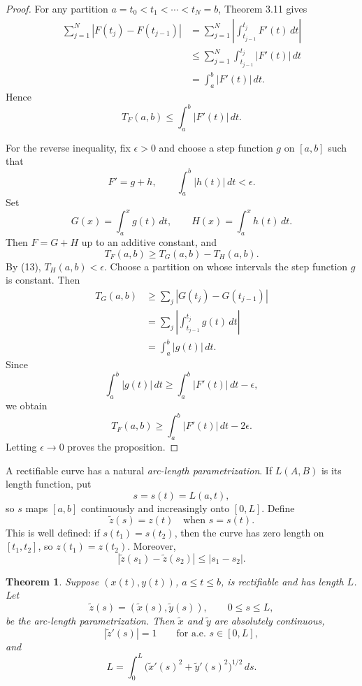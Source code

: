 \documentclass[11pt,openany]{book}
\newtheorem{theorem}{Theorem}[section]
\begin{document}
\begin{proof}
For any partition $a=t_0<t_1<\cdots<t_N=b$, Theorem 3.11 gives
\begin{align*}
\sum_{j=1}^N|F(t_j)-F(t_{j-1})|
&=\sum_{j=1}^N\left|\int_{t_{j-1}}^{t_j}F'(t)\,dt\right|\\
&\le\sum_{j=1}^N\int_{t_{j-1}}^{t_j}|F'(t)|\,dt\\
&=\int_a^b|F'(t)|\,dt.
\end{align*}
Hence
\begin{equation}
T_F(a,b)\le\int_a^b|F'(t)|\,dt.
\tag{13}
\end{equation}

For the reverse inequality, fix $\epsilon>0$ and choose a step function $g$ on $[a,b]$ such that
\[
F'=g+h,
\qquad
\int_a^b|h(t)|\,dt<\epsilon.
\]
Set
\[
G(x)=\int_a^xg(t)\,dt,
\qquad
H(x)=\int_a^xh(t)\,dt.
\]
Then $F=G+H$ up to an additive constant, and
\[
T_F(a,b)\ge T_G(a,b)-T_H(a,b).
\]
By (13), $T_H(a,b)<\epsilon$. Choose a partition on whose intervals the step function $g$ is constant. Then
\begin{align*}
T_G(a,b)
&\ge\sum_j|G(t_j)-G(t_{j-1})|\\
&=\sum_j\left|\int_{t_{j-1}}^{t_j}g(t)\,dt\right|\\
&=\int_a^b|g(t)|\,dt.
\end{align*}
Since
\[
\int_a^b|g(t)|\,dt
\ge\int_a^b|F'(t)|\,dt-\epsilon,
\]
we obtain
\[
T_F(a,b)\ge\int_a^b|F'(t)|\,dt-2\epsilon.
\]
Letting $\epsilon\to0$ proves the proposition.
\end{proof}

A rectifiable curve has a natural \emph{arc-length parametrization}. If $L(A,B)$ is its length function, put
\[
s=s(t)=L(a,t),
\]
so $s$ maps $[a,b]$ continuously and increasingly onto $[0,L]$. Define
\[
\widetilde z(s)=z(t)\quad\text{when }s=s(t).
\]
This is well defined: if $s(t_1)=s(t_2)$, then the curve has zero length on $[t_1,t_2]$, so $z(t_1)=z(t_2)$. Moreover,
\[
|\widetilde z(s_1)-\widetilde z(s_2)|\le|s_1-s_2|.
\]

\begin{theorem}
Suppose $(x(t),y(t))$, $a\le t\le b$, is rectifiable and has length $L$. Let
\[
\widetilde z(s)=(\widetilde x(s),\widetilde y(s)),\qquad0\le s\le L,
\]
be the arc-length parametrization. Then $\widetilde x$ and $\widetilde y$ are absolutely continuous,
\[
|\widetilde z'(s)|=1
\qquad\text{for a.e. }s\in[0,L],
\]
and
\[
L=\int_0^L\bigl(\widetilde x'(s)^2+\widetilde y'(s)^2\bigr)^{1/2}\,ds.
\]
\end{theorem}
\end{document}

